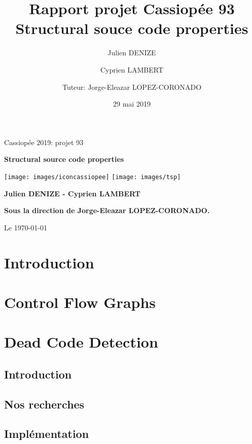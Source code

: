 \documentclass[a4paper, titlepage]{report}
\title{Rapport projet Cassiopée 93\\ \large Structural souce code properties}      %
\author{Julien DENIZE \and Cyprien LAMBERT \\ \and Tuteur: Jorge-Eleazar LOPEZ-CORONADO}           %
\date{29 mai 2019}           %
\begin{document}
\begin{titlepage}
    \parindent=0pt
    Cassiopée 2019: projet 93 
    \begin{center}\bfseries\Huge
        Structural source code properties
    \end{center}
    \vspace*{1cm}
    \begin{center}
        \texttt{[image: images/iconcassiopee]}
        \texttt{[image: images/tsp]}
        \end{center}
    \begin{center}\bfseries\Large
    Julien DENIZE - Cyprien LAMBERT
    \end{center}
        
    \begin{center}\bfseries\Large
    Sous la direction de Jorge-Eleazar LOPEZ-CORONADO.
    \end{center}
    \begin{flushright}
            Le \today 
    \end{flushright}
\end{titlepage}
\tableofcontents


\chapter{Introduction} 

\chapter{Control Flow Graphs}

\chapter{Dead Code Detection}
\section{Introduction}
\section{Nos recherches}
\section{Implémentation}



\end{document}
